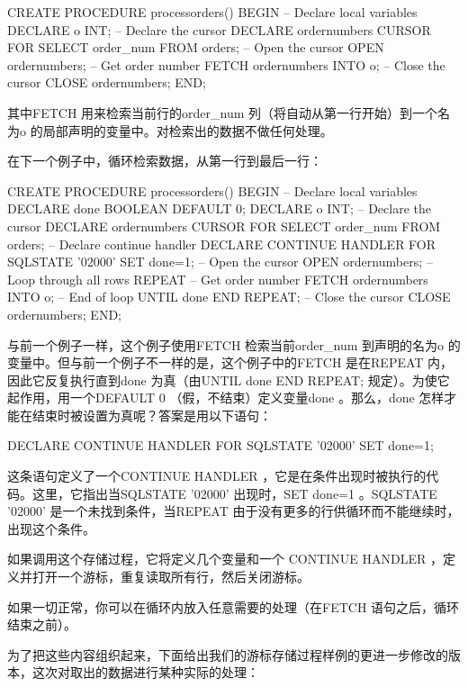 \begin{sql}
CREATE PROCEDURE processorders()
BEGIN
   -- Declare local variables
   DECLARE o INT;
   -- Declare the cursor
   DECLARE ordernumbers CURSOR
   FOR
   SELECT order_num FROM orders;
   -- Open the cursor
   OPEN ordernumbers;
   -- Get order number
   FETCH ordernumbers INTO o;
   -- Close the cursor
   CLOSE ordernumbers;
END;
\end{sql}

其中FETCH 用来检索当前行的order\_num 列（将自动从第一行开始）到一个名为o 的局部声明的变量中。对检索出的数据不做任何处理。

在下一个例子中，循环检索数据，从第一行到最后一行：

\begin{sql}
CREATE PROCEDURE processorders()
BEGIN
   -- Declare local variables
   DECLARE done BOOLEAN DEFAULT 0;
   DECLARE o INT;
   -- Declare the cursor
   DECLARE ordernumbers CURSOR
   FOR
   SELECT order_num FROM orders;
   -- Declare continue handler
   DECLARE CONTINUE HANDLER FOR SQLSTATE '02000' SET done=1;
   -- Open the cursor
   OPEN ordernumbers;
   -- Loop through all rows
   REPEAT
      -- Get order number
      FETCH ordernumbers INTO o;
   -- End of loop
   UNTIL done END REPEAT;
   -- Close the cursor
   CLOSE ordernumbers;
END;
\end{sql}

与前一个例子一样，这个例子使用FETCH 检索当前order\_num 到声明的名为o 的变量中。但与前一个例子不一样的是，这个例子中的FETCH 是在REPEAT 内，因此它反复执行直到done 为真（由UNTIL done END REPEAT; 规定）。为使它起作用，用一个DEFAULT 0 （假，不结束）定义变量done 。那么，done 怎样才能在结束时被设置为真呢？答案是用以下语句：

\begin{sql}
DECLARE CONTINUE HANDLER FOR SQLSTATE '02000' SET done=1;
\end{sql}

这条语句定义了一个CONTINUE HANDLER ，它是在条件出现时被执行的代码。这里，它指出当SQLSTATE '02000' 出现时，SET done=1 。SQLSTATE '02000' 是一个未找到条件，当REPEAT 由于没有更多的行供循环而不能继续时，出现这个条件。

如果调用这个存储过程，它将定义几个变量和一个 CONTINUE HANDLER ，定义并打开一个游标，重复读取所有行，然后关闭游标。

如果一切正常，你可以在循环内放入任意需要的处理（在FETCH 语句之后，循环结束之前）。

为了把这些内容组织起来，下面给出我们的游标存储过程样例的更进一步修改的版本，这次对取出的数据进行某种实际的处理：

